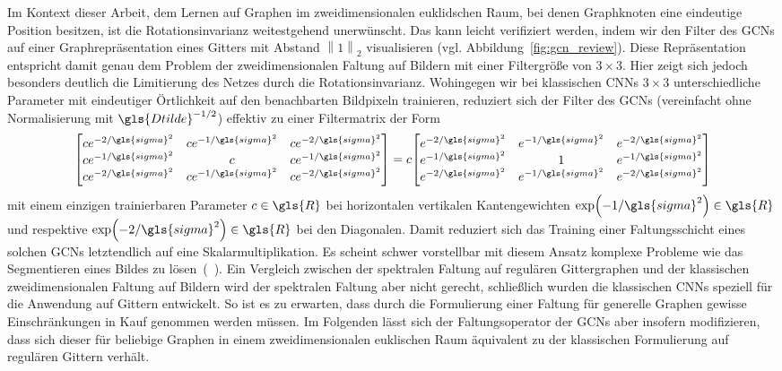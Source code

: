 Im Kontext dieser Arbeit, dem Lernen auf Graphen im zweidimensionalen euklidschen Raum, bei denen Graphknoten eine eindeutige Position besitzen, ist die Rotationsinvarianz weitestgehend unerwünscht.
Das kann leicht verifiziert werden, indem wir den Filter des \glspl{GCN} auf einer Graphrepräsentation eines Gitters mit Abstand $\left\|1\right\|_2$ visualisieren (vgl. Abbildung~\ref{fig:gcn_review}).
Diese Repräsentation entspricht damit genau dem Problem der zweidimensionalen Faltung auf Bildern mit einer Filtergröße von $3 \times 3$.
Hier zeigt sich jedoch besonders deutlich die Limitierung des Netzes durch die Rotationsinvarianz.
Wohingegen wir bei klassischen \glspl{CNN} $3 \times 3$ unterschiedliche Parameter mit eindeutiger Örtlichkeit auf den benachbarten Bildpixeln trainieren, reduziert sich der Filter des \glspl{GCN} (vereinfacht ohne Normalisierung mit $\gls{Dtilde}^{-1/2}$) effektiv zu einer Filtermatrix der Form
\begin{equation*}
  \begin{bmatrix}
    ce^{-2/\gls{sigma}^2} & ce^{-1/\gls{sigma}^2} & ce^{-2/\gls{sigma}^2}\\
    ce^{-1/\gls{sigma}^2} & c & ce^{-1/\gls{sigma}^2}\\
    ce^{-2/\gls{sigma}^2} & ce^{-1/\gls{sigma}^2} & ce^{-2/\gls{sigma}^2}
  \end{bmatrix} = c \begin{bmatrix}
    e^{-2/\gls{sigma}^2} & e^{-1/\gls{sigma}^2} & e^{-2/\gls{sigma}^2}\\
    e^{-1/\gls{sigma}^2} & 1 & e^{-1/\gls{sigma}^2}\\
    e^{-2/\gls{sigma}^2} & e^{-1/\gls{sigma}^2} & e^{-2/\gls{sigma}^2}
  \end{bmatrix}
\end{equation*}
mit einem einzigen trainierbaren Parameter $c \in \gls{R}$ bei horizontalen \bzw{} vertikalen Kantengewichten $\exp\left(-1/\gls{sigma}^2\right) \in \gls{R}$ und respektive $\exp\left(-2/\gls{sigma}^2\right) \in \gls{R}$ bei den Diagonalen.
Damit reduziert sich das Training einer Faltungsschicht eines solchen \glspl{GCN} letztendlich auf eine Skalarmultiplikation.
Es scheint schwer vorstellbar mit diesem Ansatz komplexe Probleme wie \zB{} das Segmentieren eines Bildes zu lösen~(\vgl{}~\cite{gcn_review}).
Ein Vergleich zwischen der spektralen Faltung auf regulären Gittergraphen und der klassischen zweidimensionalen Faltung auf Bildern wird der spektralen Faltung aber nicht gerecht, schließlich wurden die klassischen \glspl{CNN} speziell für die Anwendung auf Gittern entwickelt.
So ist es zu erwarten, dass durch die Formulierung einer Faltung für generelle Graphen gewisse Einschränkungen in Kauf genommen werden müssen.
Im Folgenden lässt sich der Faltungsoperator der \glspl{GCN} aber insofern modifizieren, dass sich dieser für beliebige Graphen in einem zweidimensionalen euklischen Raum äquivalent zu der klassischen Formulierung auf regulären Gittern verhält.


